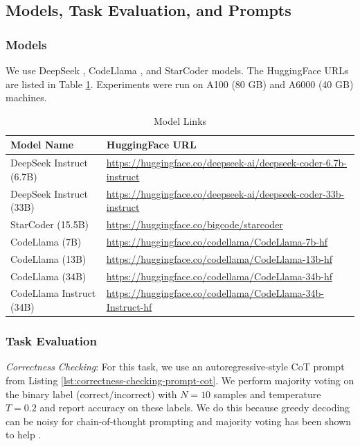 \subsection{Models, Task Evaluation, and Prompts}\label{appendix:task-evaluation-prompts}
\subsubsection{Models}
We use DeepSeek \citep{guo2024deepseek}, CodeLlama \citep{roziere2023code}, and StarCoder \citep{li2023starcoder} models. The HuggingFace URLs are listed in Table \ref{tab:model-url-list}. Experiments were run on A100 (80 GB) and A6000 (40 GB) machines.
\begin{table}[h]
    \centering
    \small
    \caption{Model Links}
    \begin{tabular}{|ll|}
        \hline
        \textbf{Model Name} & \textbf{HuggingFace URL} \\
        \hline
        DeepSeek Instruct (6.7B) & \url{https://huggingface.co/deepseek-ai/deepseek-coder-6.7b-instruct} \\
        DeepSeek Instruct (33B) & \url{https://huggingface.co/deepseek-ai/deepseek-coder-33b-instruct} \\
        StarCoder (15.5B) & \url{https://huggingface.co/bigcode/starcoder} \\
        CodeLlama (7B) & \url{https://huggingface.co/codellama/CodeLlama-7b-hf} \\
        CodeLlama (13B) & \url{https://huggingface.co/codellama/CodeLlama-13b-hf} \\
        CodeLlama (34B) & \url{https://huggingface.co/codellama/CodeLlama-34b-hf} \\
        CodeLlama Instruct (34B) & \url{https://huggingface.co/codellama/CodeLlama-34b-Instruct-hf} \\
        \hline
    \end{tabular}
    \label{tab:model-url-list}
\end{table}


\subsubsection{Task Evaluation}
\label{sec:task-eval}
\textit{Correctness Checking}: For this task, we use an autoregressive-style CoT prompt from Listing \ref{lst:correctness-checking-prompt-cot}. We perform majority voting on the binary label (correct/incorrect) with $N=10$ samples and temperature $T=0.2$ and report accuracy on these labels. We do this because greedy decoding can be noisy for chain-of-thought prompting and majority voting has been shown to help \citep{wei2022chain, wang2022self}.

